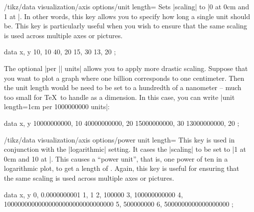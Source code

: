 \begin{key}{/tikz/data visualization/axis options/unit length=}
    Sets |scaling| to |0 at 0cm and 1 at |. In other words,
    this key allows you to specify how long a single unit should be. This key
    is particularly useful when you wish to ensure that the same scaling is
    used across multiple axes or pictures.
\begin{codeexample}[]
\tikz \datavisualization [scientific axes,
                          all axes={ticks=few, unit length=1mm},
                          visualize as line]
    data {
      x, y
      10, 10
      40, 20
      15, 30
      13, 20
    };
\end{codeexample}
    The optional |per || units| allows you to apply more drastic
    scaling. Suppose that you want to plot a graph where one billion
    corresponds to one centimeter. Then the unit length would be need to be set
    to a hundredth of a nanometer -- much too small for \TeX\ to handle as a
    dimension. In this case, you can write
    |unit length=1cm per 1000000000 units|:
\begin{codeexample}[]
\tikz \datavisualization
  [scientific axes,
   x axis={unit length=1mm per 1000000000 units, ticks=few},
   visualize as line]
 data {
   x, y
   10000000000, 10
   40000000000, 20
   15000000000, 30
   13000000000, 20
 };
\end{codeexample}
\end{key}
%
\begin{key}{/tikz/data visualization/axis options/power unit length=}
    This key is used in conjunction with the |logarithmic| setting. It cases
    the |scaling| to be set to |1 at 0cm and 10 at |. This
    causes a ``power unit'', that is, one power of ten in a logarithmic plot,
    to get a length of . Again, this key is useful for ensuring
    that the same scaling is used across multiple axes or pictures.
\begin{codeexample}[width=8cm]
\tikz \datavisualization
  [scientific axes,
   y axis={logarithmic, power unit length=1mm, grid},
   visualize as line]
 data {
   x, y
   0, 0.0000000001
   1, 1
   2, 100000
   3, 100000000000
   4, 10000000000000000000000000000000
   5, 500000000
   6, 5000000000000000000
 };
\end{codeexample}
\end{key}


